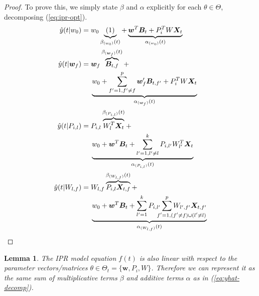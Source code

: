 \documentclass[10pt]{proc}
\newtheorem{lemma}{Lemma}
\newtheorem{proof}{Proof}
\begin{document}
\begin{proof}
    To prove this, we simply state $\beta$ and $\alpha$ explicitly for each
    $\theta \in \Theta$, decomposing (\ref{eq:ipr-opt}).
    \begin{align}
        \hat{y}(t | w_0) &= \begin{aligned}[t]  \label{eq:decomp-w0}
            w_0 \underbrace{(1)}_{\beta_{(w_0)}(t)} +
            \underbrace{
                \bm{w}^T \bm{B}_t + P_i^T W \bm{X}_t
            }_{\alpha_{(w_0)}(t)}
        \end{aligned} \\
        \hat{y}(t | \bm{w}_f) &= \begin{aligned}[t]  \label{eq:decomp-w_f}
            & \bm{w}_f \overbrace{
                \bm{B}_{t,f}
            }^{\beta_{(\bm{w}_f)}(t)} + \\
            & \underbrace{
                w_0 + \sum_{f'=1, f' \neq f}^p \bm{w}_f' \bm{B}_{t,f'} +
                P_i^T W \bm{X}_t
            }_{\alpha_{(\bm{w}_f)}(t)}
        \end{aligned} \\
        \hat{y}(t | P_{i,l}) &= \begin{aligned}[t]  \label{eq:decomp-P_il}
            & P_{i,l} \overbrace{
                W_l^T \bm{X}_t
            }^{\beta_{(P_{i,l})}(t)} + \\
          & \underbrace{
                w_0 + \bm{w}^T \bm{B}_t +
                \sum_{l'=1, l' \neq l}^k P_{i,l'} W_{l'}^T \bm{X}_t
            }_{\alpha_{(P_{i,l})}(t)}
        \end{aligned} \\
        \hat{y}(t | W_{l,f}) &= \begin{aligned}[t]  \label{eq:decomp-W_lf}
            & W_{l,f} \overbrace{
                P_{i,l} \bm{X}_{t,f}
            }^{\beta_{(W_{l,f})}(t)} + \\
          & \underbrace{
                w_0 + \bm{w}^T \bm{B}_t +
                \sum_{l'=1}^k P_{i,l'}
                    \sum_{\mathrlap{\hspace{-5mm}
                        f'=1, (f' \neq f) \cup (l' \neq l)}}^p
                            W_{l',f'} \bm{X}_{t,f'}
            }_{\alpha_{(W_{l,f})}(t)}
        \end{aligned}
    \end{align}
\end{proof}


\begin{lemma}
    The IPR model equation $f(t)$ is also linear with respect to the parameter
    vectors/matrices $\mathrel{\theta \in \Theta_t = \{} \bm{w}, P_i, W\}$.
    Therefore we can represent it as the same sum of multiplicative terms
    $\beta$ and additive terms $\alpha$ as in (\ref{eq:yhat-decomp}).
\end{lemma}
\end{document}
